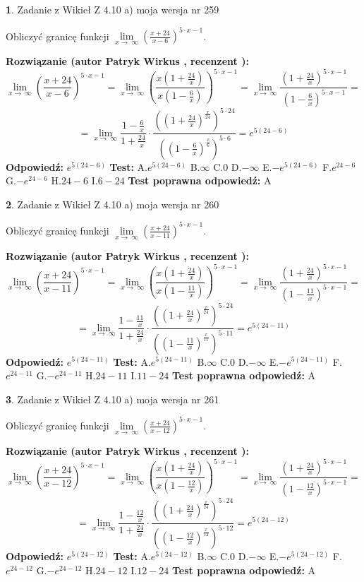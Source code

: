 \documentclass[12pt, a4paper]{article}
\theoremstyle{definition} %
\newtheorem{zad}{}
\newcommand{\zadStart}[1]{\begin{zad}#1\newline}
\newcommand{\zadStop}{\end{zad}}
\newcommand{\rozwStart}[2]{\noindent \textbf{Rozwiązanie (autor #1 , recenzent #2): }\newline}
\newcommand{\rozwStop}{\newline}
\newcommand{\odpStart}{\noindent \textbf{Odpowiedź:}\newline}
\newcommand{\odpStop}{\newline}
\newcommand{\testStart}{\noindent \textbf{Test:}\newline}
\newcommand{\testStop}{\newline}
\newcommand{\kluczStart}{\noindent \textbf{Test poprawna odpowiedź:}\newline}
\newcommand{\kluczStop}{\newline}
\begin{document}
\zadStart{Zadanie z Wikieł Z 4.10 a) moja wersja nr 259}


Obliczyć granicę funkcji  $\lim\limits_{x\to\ \infty}(\frac{x+24}{x-6})^{5\cdot x-1}$.
\zadStop
\rozwStart{Patryk Wirkus}{}
$$\lim\limits_{x\to\ \infty}(\frac{x+24}{x-6})^{5\cdot x-1} = \lim\limits_{x\to\ \infty}(\frac{x(1+\frac{24}{x})}{x(1-\frac{6}{x})})^{5\cdot x-1}=\lim\limits_{x\to\ \infty}\frac{(1+\frac{24}{x})^{5\cdot x-1}}{(1-\frac{6}{x})^{5\cdot x-1}}=$$
$$=\lim\limits_{x\to\ \infty}\frac{1-\frac{6}{x}}{1+\frac{24}{x}}\cdot\frac{((1+\frac{24}{x})^{\frac{x}{24}})^{5\cdot24}}{((1-\frac{6}{x})^{\frac{x}{6}})^{5\cdot6}}=e^{5(24-6)}$$
\rozwStop
\odpStart
$e^{5(24-6)}$
\odpStop
\testStart
A.$e^{5(24-6)}$ B.$\infty$ C.$0$ D.$-\infty$ E.$-e^{5(24-6)}$
F.$e^{24-6}$ G.$-e^{24-6}$
H.$24-6$
I.$6-24$
\testStop
\kluczStart
A
\kluczStop



\zadStart{Zadanie z Wikieł Z 4.10 a) moja wersja nr 260}


Obliczyć granicę funkcji  $\lim\limits_{x\to\ \infty}(\frac{x+24}{x-11})^{5\cdot x-1}$.
\zadStop
\rozwStart{Patryk Wirkus}{}
$$\lim\limits_{x\to\ \infty}(\frac{x+24}{x-11})^{5\cdot x-1} = \lim\limits_{x\to\ \infty}(\frac{x(1+\frac{24}{x})}{x(1-\frac{11}{x})})^{5\cdot x-1}=\lim\limits_{x\to\ \infty}\frac{(1+\frac{24}{x})^{5\cdot x-1}}{(1-\frac{11}{x})^{5\cdot x-1}}=$$
$$=\lim\limits_{x\to\ \infty}\frac{1-\frac{11}{x}}{1+\frac{24}{x}}\cdot\frac{((1+\frac{24}{x})^{\frac{x}{24}})^{5\cdot24}}{((1-\frac{11}{x})^{\frac{x}{11}})^{5\cdot11}}=e^{5(24-11)}$$
\rozwStop
\odpStart
$e^{5(24-11)}$
\odpStop
\testStart
A.$e^{5(24-11)}$ B.$\infty$ C.$0$ D.$-\infty$ E.$-e^{5(24-11)}$
F.$e^{24-11}$ G.$-e^{24-11}$
H.$24-11$
I.$11-24$
\testStop
\kluczStart
A
\kluczStop



\zadStart{Zadanie z Wikieł Z 4.10 a) moja wersja nr 261}


Obliczyć granicę funkcji  $\lim\limits_{x\to\ \infty}(\frac{x+24}{x-12})^{5\cdot x-1}$.
\zadStop
\rozwStart{Patryk Wirkus}{}
$$\lim\limits_{x\to\ \infty}(\frac{x+24}{x-12})^{5\cdot x-1} = \lim\limits_{x\to\ \infty}(\frac{x(1+\frac{24}{x})}{x(1-\frac{12}{x})})^{5\cdot x-1}=\lim\limits_{x\to\ \infty}\frac{(1+\frac{24}{x})^{5\cdot x-1}}{(1-\frac{12}{x})^{5\cdot x-1}}=$$
$$=\lim\limits_{x\to\ \infty}\frac{1-\frac{12}{x}}{1+\frac{24}{x}}\cdot\frac{((1+\frac{24}{x})^{\frac{x}{24}})^{5\cdot24}}{((1-\frac{12}{x})^{\frac{x}{12}})^{5\cdot12}}=e^{5(24-12)}$$
\rozwStop
\odpStart
$e^{5(24-12)}$
\odpStop
\testStart
A.$e^{5(24-12)}$ B.$\infty$ C.$0$ D.$-\infty$ E.$-e^{5(24-12)}$
F.$e^{24-12}$ G.$-e^{24-12}$
H.$24-12$
I.$12-24$
\testStop
\kluczStart
A
\kluczStop
\end{document}
